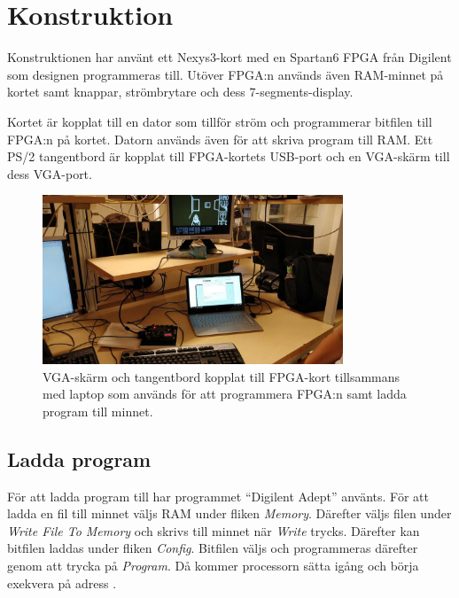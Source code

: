 \documentclass[main.tex]{subfiles}
\begin{document}

\section{Konstruktion}
Konstruktionen har använt ett Nexys3-kort med en Spartan6 FPGA från Digilent
som designen programmeras till. Utöver FPGA:n används även RAM-minnet på kortet
samt knappar, strömbrytare och dess 7-segments-display.

Kortet är kopplat till en dator som tillför ström och programmerar bitfilen
till FPGA:n på kortet. Datorn används även för att skriva program till RAM.
Ett PS/2 tangentbord är kopplat till FPGA-kortets USB-port och en VGA-skärm
till dess VGA-port.  

\begin{figure}
    \centering
    \includegraphics[width=0.8\textwidth,bb=0 0 1152 648]{img/setup_small.jpg}
    \caption{VGA-skärm och tangentbord kopplat till FPGA-kort tillsammans med
    laptop som används för att programmera FPGA:n samt ladda program till
    minnet.}
\end{figure}

\subsection{Ladda program}
För att ladda program till har programmet ``Digilent Adept'' använts. För att
ladda en fil till minnet väljs RAM under fliken {\it Memory}. Därefter väljs
filen under {\it Write File To Memory} och skrivs till minnet när {\it Write}
trycks. Därefter kan bitfilen laddas under fliken {\it Config}. Bitfilen väljs
och programmeras därefter genom att trycka på {\it Program}. Då kommer
processorn sätta igång och börja exekvera på adress .
\end{document}
